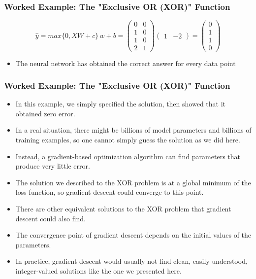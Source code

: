 \documentclass[
  shownotes,
  xcolor={svgnames},
  hyperref={colorlinks,citecolor=DarkBlue,linkcolor=DarkRed,urlcolor=DarkBlue}
  , aspectratio=169]{beamer}
\begin{document}
\begin{frame}
\frametitle{Worked Example: The "Exclusive OR (XOR)" Function}


\[
\hat{y}=max\{0,XW+c\}\,w + b=\left(\begin{array}{cc}
0 & 0\\
1 & 0\\
1 & 0\\
2 & 1
\end{array}\right)\left(\begin{array}{cc}
1 & -2\end{array}\right)=\left(\begin{array}{c}
0\\
1\\
1\\
0
\end{array}\right)
\]

\vspace{2cm}
\begin{itemize}
\item The neural network has obtained the correct answer for every data point
\end{itemize}

\end{frame}
\begin{frame}
\frametitle{Worked Example: The "Exclusive OR (XOR)" Function}

\begin{itemize}
\item In this example, we simply specified the solution, then showed that
it obtained zero error.
\item In a real situation, there might be billions of model parameters and
billions of training examples, so one cannot simply guess the solution
as we did here.
\item Instead, a gradient-based optimization algorithm can find parameters
that produce very little error. 
\item The solution we described to the XOR problem is at a global minimum
of the loss function, so gradient descent could converge to this point.
\item There are other equivalent solutions to the XOR problem that gradient
descent could also find. 
\item The convergence point of gradient descent depends on the initial values
of the parameters. 
\item In practice, gradient descent would usually not find clean, easily
understood, integer-valued solutions like the one we presented here.
\end{itemize}


\end{frame}
\end{document}
